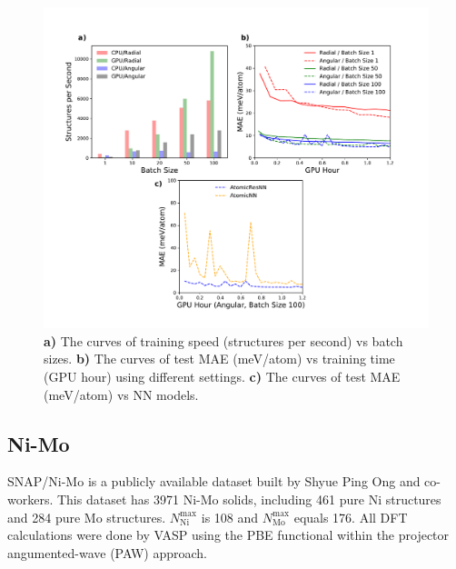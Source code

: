 \documentclass[preprint]{revtex4-2}
\begin{document}
\begin{figure}[h!]
\centering
\includegraphics[scale=0.54]{figures/Fig4-qm7.pdf}
\caption{\label{fig:benchmark_qm7} 
\textbf{a)} The curves of training speed (structures per second) vs batch sizes. 
\textbf{b)} The curves of test MAE (meV/atom) vs training time (GPU hour) using 
different settings.
\textbf{c)} The curves of test MAE (meV/atom) vs NN models. 
}
\end{figure}

\subsection{Ni-Mo}

SNAP/Ni-Mo\cite{SNAP_Mo_2017, SNAP_2018} is a publicly available dataset built 
by Shyue Ping Ong and co-workers. This dataset has 3971 Ni-Mo solids, including 
461 pure Ni structures and 284 pure Mo structures. 
$N_{\mathrm{Ni}}^{\mathrm{max}}$ is 108 and $N_{\mathrm{Mo}}^{\mathrm{max}}$ 
equals 176. All DFT calculations were done by VASP\cite{VASP} using the 
PBE\cite{PBE} functional within the projector angumented-wave (PAW)\cite{PAW} 
approach.
\end{document}

